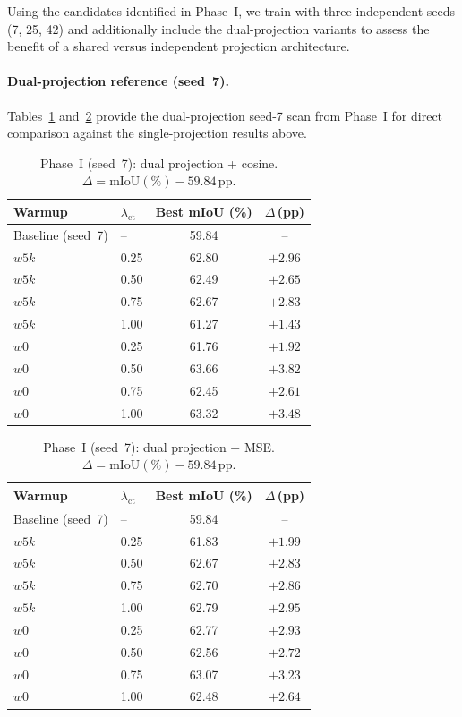 Using the candidates identified in Phase~I, we train with three
independent seeds (7, 25, 42) and additionally include the dual-projection
variants to assess the benefit of a shared versus independent projection
architecture.

\paragraph{Dual-projection reference (seed~7).}
Tables~\ref{tab:ct-p1-dual-cos} and~\ref{tab:ct-p1-dual-mse} provide
the dual-projection seed-7 scan from Phase~I for direct comparison
against the single-projection results above.

\begin{table}[H]
\centering
\caption{Phase~I (seed~7): dual projection + cosine.
$\Delta = \text{mIoU}(\%) - 59.84$\,pp.}
\label{tab:ct-p1-dual-cos}
\renewcommand{\arraystretch}{1.2}
\begin{tabular}{llcc}
\toprule
Warmup & $\lambda_\text{ct}$ & Best mIoU (\%) & $\Delta$\,(pp) \\
\midrule
Baseline (seed~7) & -- & 59.84 & -- \\
\midrule
$w5k$ & 0.25 & 62.80 & $+2.96$ \\
$w5k$ & 0.50 & 62.49 & $+2.65$ \\
$w5k$ & 0.75 & 62.67 & $+2.83$ \\
$w5k$ & 1.00 & 61.27 & $+1.43$ \\
\midrule
$w0$  & 0.25 & 61.76 & $+1.92$ \\
$w0$  & 0.50 & 63.66 & $+3.82$ \\
$w0$  & 0.75 & 62.45 & $+2.61$ \\
$w0$  & 1.00 & 63.32 & $+3.48$ \\
\bottomrule
\end{tabular}
\end{table}

\begin{table}[H]
\centering
\caption{Phase~I (seed~7): dual projection + MSE.
$\Delta = \text{mIoU}(\%) - 59.84$\,pp.}
\label{tab:ct-p1-dual-mse}
\renewcommand{\arraystretch}{1.2}
\begin{tabular}{llcc}
\toprule
Warmup & $\lambda_\text{ct}$ & Best mIoU (\%) & $\Delta$\,(pp) \\
\midrule
Baseline (seed~7) & -- & 59.84 & -- \\
\midrule
$w5k$ & 0.25 & 61.83 & $+1.99$ \\
$w5k$ & 0.50 & 62.67 & $+2.83$ \\
$w5k$ & 0.75 & 62.70 & $+2.86$ \\
$w5k$ & 1.00 & 62.79 & $+2.95$ \\
\midrule
$w0$  & 0.25 & 62.77 & $+2.93$ \\
$w0$  & 0.50 & 62.56 & $+2.72$ \\
$w0$  & 0.75 & 63.07 & $+3.23$ \\
$w0$  & 1.00 & 62.48 & $+2.64$ \\
\bottomrule
\end{tabular}
\end{table}

